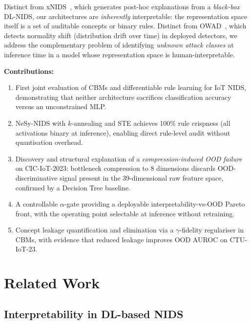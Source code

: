 \documentclass[conference]{IEEEtran}
\begin{document}
Distinct from xNIDS~\cite{wei2023xnids}, which generates post-hoc
explanations from a \emph{black-box} DL-NIDS, our architectures are
\emph{inherently} interpretable: the representation space itself is a set
of auditable concepts or binary rules. Distinct from OWAD~\cite{han2023owad},
which detects normality shift (distribution drift over time) in deployed
detectors, we address the complementary problem of identifying
\emph{unknown attack classes} at inference time in a model whose
representation space is human-interpretable.

\smallskip
\noindent\textbf{Contributions:}
\begin{enumerate}
  \item First joint evaluation of CBMs and differentiable rule learning for
    IoT NIDS, demonstrating that neither architecture sacrifices
    classification accuracy versus an unconstrained MLP.
  \item NeSy-NIDS with $k$-annealing and STE achieves 100\% rule crispness
    (all activations binary at inference), enabling direct rule-level audit
    without quantisation overhead.
  \item Discovery and structural explanation of a \emph{compression-induced
    OOD failure} on CIC-IoT-2023: bottleneck compression to 8 dimensions
    discards OOD-discriminative signal present in the 39-dimensional raw
    feature space, confirmed by a Decision Tree baseline.
  \item A controllable $\alpha$-gate providing a deployable
    interpretability-vs-OOD Pareto front, with the operating point
    selectable at inference without retraining.
  \item Concept leakage quantification and elimination via a
    $\gamma$-fidelity regulariser in CBMs, with evidence that reduced
    leakage improves OOD AUROC on CTU-IoT-23.
\end{enumerate}

\section{Related Work}

\subsection{Interpretability in DL-based NIDS}
\end{document}

